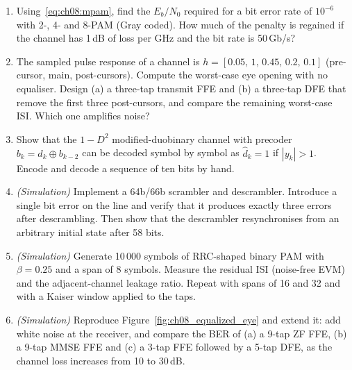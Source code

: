 \begin{enumerate}[label=\thechapter.\arabic*]
picoseconds.
\item Using~\eqref{eq:ch08:mpam}, find the $E_b/N_0$ required for a bit error rate of $10^{-6}$
with 2-, 4- and 8-PAM (Gray coded). How much of the penalty is regained if the channel has 1\,dB
of loss per GHz and the bit rate is 50\,Gb/s?
\item The sampled pulse response of a channel is $h=[0.05,\,1,\,0.45,\,0.2,\,0.1]$ (pre-cursor,
main, post-cursors). Compute the worst-case eye opening with no equaliser. Design (a) a three-tap
transmit FFE and (b) a three-tap DFE that remove the first three post-cursors, and compare the
remaining worst-case ISI. Which one amplifies noise?
\item Show that the $1-D^2$ modified-duobinary channel with precoder $b_k=d_k\oplus b_{k-2}$ can be
decoded symbol by symbol as $\hat d_k=1$ if $|y_k|>1$. Encode and decode a sequence of ten bits by
hand.
\item \emph{(Simulation)} Implement a 64b/66b scrambler and descrambler. Introduce a single bit
error on the line and verify that it produces exactly three errors after descrambling. Then show
that the descrambler resynchronises from an arbitrary initial state after 58 bits.
\item \emph{(Simulation)} Generate 10\,000 symbols of RRC-shaped binary PAM with $\beta=0.25$ and
a span of 8 symbols. Measure the residual ISI (noise-free EVM) and the adjacent-channel leakage
ratio. Repeat with spans of 16 and 32 and with a Kaiser window applied to the taps.
\item \emph{(Simulation)} Reproduce Figure~\ref{fig:ch08_equalized_eye} and extend it: add white
noise at the receiver, and compare the BER of (a) a 9-tap ZF FFE, (b) a 9-tap MMSE FFE and (c) a
3-tap FFE followed by a 5-tap DFE, as the channel loss increases from 10 to 30\,dB.
\end{enumerate}

